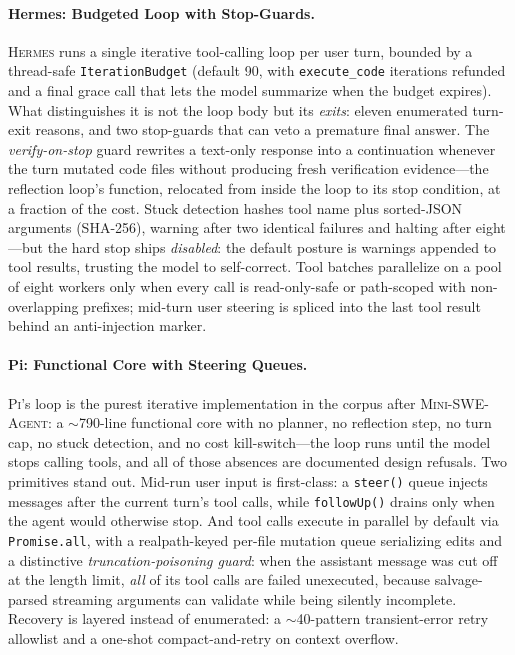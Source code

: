 \documentclass[11pt,a4paper]{article}
\newcommand{\mswe}{\textsc{Mini-SWE-Agent}\xspace}
\newcommand{\hrm}{\textsc{Hermes}\xspace}
\newcommand{\pib}{\textsc{Pi}\xspace}
\begin{document}
\paragraph{Hermes: Budgeted Loop with Stop-Guards.}
\hrm{} runs a single iterative tool-calling loop per user turn, bounded by a thread-safe \texttt{IterationBudget} (default 90, with \texttt{execute\_code} iterations refunded and a final grace call that lets the model summarize when the budget expires).
What distinguishes it is not the loop body but its \emph{exits}: eleven enumerated turn-exit reasons, and two stop-guards that can veto a premature final answer.
The \emph{verify-on-stop} guard rewrites a text-only response into a continuation whenever the turn mutated code files without producing fresh verification evidence---the reflection loop's function, relocated from inside the loop to its stop condition, at a fraction of the cost.
Stuck detection hashes tool name plus sorted-JSON arguments (SHA-256), warning after two identical failures and halting after eight---but the hard stop ships \emph{disabled}: the default posture is warnings appended to tool results, trusting the model to self-correct.
Tool batches parallelize on a pool of eight workers only when every call is read-only-safe or path-scoped with non-overlapping prefixes; mid-turn user steering is spliced into the last tool result behind an anti-injection marker.

\paragraph{Pi: Functional Core with Steering Queues.}
\pib{}'s loop is the purest iterative implementation in the corpus after \mswe{}: a $\sim$790-line functional core with no planner, no reflection step, no turn cap, no stuck detection, and no cost kill-switch---the loop runs until the model stops calling tools, and all of those absences are documented design refusals.
Two primitives stand out.
Mid-run user input is first-class: a \texttt{steer()} queue injects messages after the current turn's tool calls, while \texttt{followUp()} drains only when the agent would otherwise stop.
And tool calls execute in parallel by default via \texttt{Promise.all}, with a realpath-keyed per-file mutation queue serializing edits and a distinctive \emph{truncation-poisoning guard}: when the assistant message was cut off at the length limit, \emph{all} of its tool calls are failed unexecuted, because salvage-parsed streaming arguments can validate while being silently incomplete.
Recovery is layered instead of enumerated: a $\sim$40-pattern transient-error retry allowlist and a one-shot compact-and-retry on context overflow.
\end{document}
